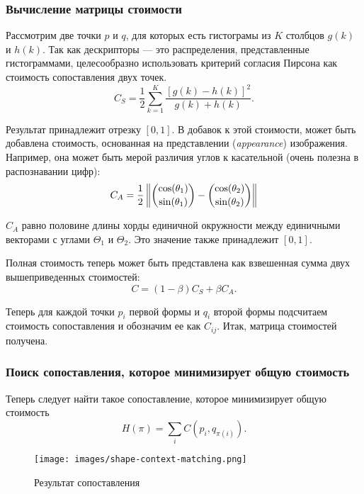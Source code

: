 \subsubsection{Вычисление матрицы стоимости}
Рассмотрим две точки $p$ и $q$, для которых есть гистограмы из $K$ столбцов $g(k)$ и $h(k)$. Так как дескрипторы --- это распределения, представленные гистограммами, целесообразно использовать критерий согласия Пирсона как стоимость сопоставления двух точек.
\begin{displaymath}
  C_S = \frac{1}{2}\sum_{k = 1}^{K}{\frac{[g(k) - h(k)]^2}{g(k) + h(k)}}.
\end{displaymath}

Результат принадлежит отрезку $[0,1]$. В добавок к этой стоимости, может быть добавлена стоимость, основанная на представлении (\emph{appearance}) изображения. Например, она может быть мерой различия углов к касательной (очень полезна в распознавании цифр):
\begin{displaymath}
  C_A = \frac{1}{2}
  \begin{Vmatrix}
    \dbinom{\cos(\theta_1)}{\sin(\theta_1)} - \dbinom{\cos(\theta_2)}{\sin(\theta_2)}
  \end{Vmatrix}
\end{displaymath}

$C_A$ равно половине длины хорды единичной окружности между единичными векторами с углами $\Theta_1$ и $\Theta_2$. Это значение также принадлежит $[0, 1]$.

Полная стоимость теперь может быть представлена как взвешенная сумма двух вышеприведенных стоимостей:
\begin{displaymath}
  C = (1 - \beta)C_S + \beta C_A.
\end{displaymath}

Теперь для каждой точки $p_i$ первой формы и $q_i$ второй формы подсчитаем стоимость сопоставления и обозначим ее как $C_{ij}$. Итак, матрица стоимостей получена.

\subsubsection{Поиск сопоставления, которое минимизирует общую стоимость}
Теперь следует найти такое сопоставление, которое минимизирует общую стоимость
\begin{displaymath}
  H(\pi) = \sum_i{C(p_i, q_{\pi(i)})}.
\end{displaymath}

\begin{figure}
  \centering
  \texttt{[image: images/shape-context-matching.png]}
  \caption{Результат сопоставления\label{shape-context-matching}}
\end{figure}

